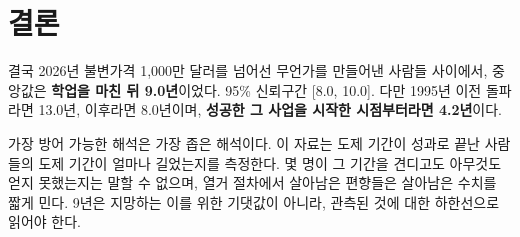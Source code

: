 \documentclass[11pt]{article}
\begin{document}
\section{결론}

결국 2026년 불변가격 1{,}000만 달러를 넘어선 무언가를 만들어낸 사람들 사이에서, 중앙값은
\textbf{학업을 마친 뒤 9.0년}이었다. 95\% 신뢰구간 [8.0, 10.0]. 다만 1995년 이전
돌파라면 13.0년, 이후라면 8.0년이며, \textbf{성공한 그 사업을 시작한 시점부터라면
4.2년}이다.

가장 방어 가능한 해석은 가장 좁은 해석이다. 이 자료는 도제 기간이 성과로 끝난 사람들의
도제 기간이 얼마나 길었는지를 측정한다. 몇 명이 그 기간을 견디고도 아무것도 얻지 못했는지는
말할 수 없으며, 열거 절차에서 살아남은 편향들은 살아남은 수치를 짧게 민다. 9년은 지망하는
이를 위한 기댓값이 아니라, 관측된 것에 대한 하한선으로 읽어야 한다.
\end{document}
